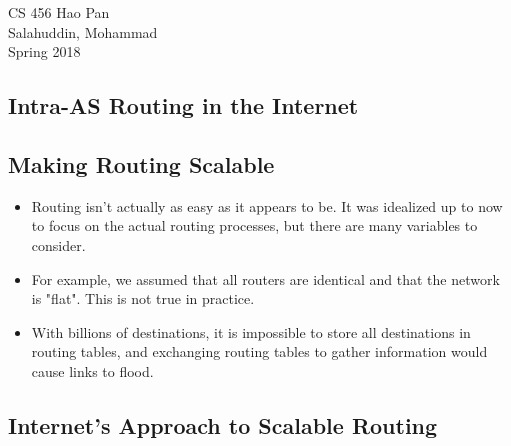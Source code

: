 \documentclass{article}
\begin{document}
\noindent
{CS 456 \hfill Hao Pan}\\
{Salahuddin, Mohammad}\\
{Spring 2018}


\begin{center}
\section{Intra-AS Routing in the Internet}
\noindent
\end{center}

\subsection{Making Routing Scalable}

\begin{itemize}
\item Routing isn't actually as easy as it appears to be. It was idealized up to now to focus on the actual routing processes, but there are many variables to consider.
\item For example, we assumed that all routers are identical and that the network is "flat". This is not true in practice.
\item With billions of destinations, it is impossible to store all destinations in routing tables, and exchanging routing tables to gather information would cause links to flood.
\end{itemize}

\subsection{Internet's Approach to Scalable Routing}
\end{document}
